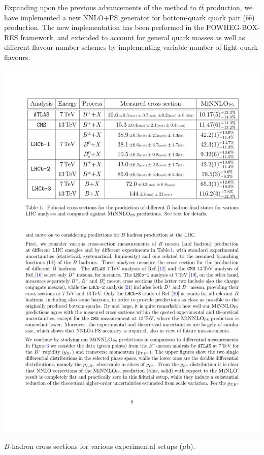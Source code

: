 \documentclass{FBR_Bericht_2025}
\begin{document}
\begin{refsection}
Expanding upon the previous advancements of the \minnlo{} method to $t \bar t$ production, 
we have implemented a new NNLO+PS generator for bottom-quark quark pair ($b\bar b$) production.
The new implementation has been performed in the POWHEG-BOX-RES framework, and extended to account for 
general quark masses as well as different flavour-number schemes by implementing
variable number of light quark flavours.

\begin{table}[b!]
\begin{center}
\includegraphics[width=1\linewidth]{plots/bb_table.pdf}
\caption{$B$-hadron cross sections for various experimental setups ($\mu$b).}
\label{tab:bb}
\end{center}
\end{table}


\end{refsection}
\end{document}
